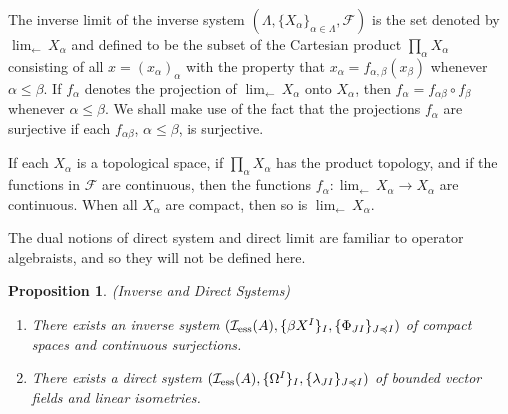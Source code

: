 \documentclass{amsart}
\newtheorem{proposition}[theorem]{Proposition}
\theoremstyle{definition}
\theoremstyle{remark}
\begin{document}
The inverse limit of the inverse system $(\Lambda, \{X_\alpha\}_{\alpha\in\Lambda}, \mathcal F)$
is the set denoted by $\displaystyle\lim_{\leftarrow}\, X_\alpha$ and defined to be the subset of the Cartesian
product $\displaystyle\prod_\alpha X_\alpha$ consisting of all $x=(x_\alpha)_\alpha$ with the
property that $x_\alpha=f_{\alpha,\beta}(x_\beta)$ whenever $\alpha\le\beta$. If $f_{\alpha}$ denotes the
projection of $\displaystyle\lim_{\leftarrow}\, X_\alpha$ onto $X_\alpha$, then
$f_\alpha=f_{\alpha\beta}\circ f_\beta$
whenever $\alpha\le\beta$. We shall make use of the fact that the projections $f_\alpha$ are surjective if
each $f_{\alpha\beta}$, $\alpha\leq\beta$, is surjective.

If each $X_\alpha$ is a topological space, if $\displaystyle\prod_\alpha X_\alpha$ has the product topology, and
if the functions in $\mathcal F$ are continuous, then the functions $f_\alpha:\displaystyle\lim_{\leftarrow}\, X_\alpha\rightarrow X_\alpha$
are continuous. When all $X_\alpha$ are compact, then so is $\displaystyle\lim_{\leftarrow}\, X_\alpha$.

The dual notions of direct system and direct limit are familiar to operator algebraists, and so they
will not be defined here.

 \begin{proposition}\label{systems1} {\rm (Inverse and Direct Systems)}
 \begin{enumerate}
 \item There exists an inverse system $( \mathcal I_{\rm ess}(A), \{\beta X^I\}_{I}, \{\Phi_{JI}\}_{J \preccurlyeq I})$
          of compact spaces and continuous surjections.
 \item There exists a direct system $( \mathcal I_{\rm ess}(A), \{\Omega^I\}_{I}, \{\lambda_{JI}\}_{J\preccurlyeq I})$
          of bounded vector fields and linear isometries.
 \end{enumerate}
 \end{proposition}
\end{document}
